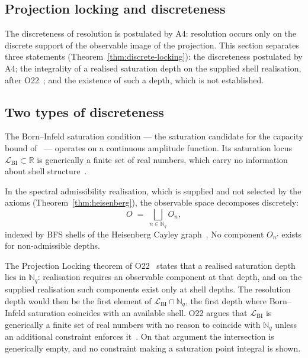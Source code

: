 \documentclass[11pt,a4paper]{article}
\begin{document}
  \subsection{Projection locking and discreteness}
    \label{sec:locking}

    The discreteness of resolution is postulated by A4: resolution occurs only on the discrete support of
    the observable image of the projection.
    This section separates three statements (Theorem~\ref{thm:discrete-locking}): the discreteness
    postulated by A4; the integrality of a realised saturation depth on the supplied shell realisation,
    after O22~\cite{Beau2026a26}; and the existence of such a depth, which is not established.

  \subsection{Two types of discreteness}

    The Born--Infeld saturation condition — the saturation candidate for the
    capacity bound of~\cite{Beau2026c} — operates on a continuous amplitude
    function.
    Its saturation locus $\mathcal{L}_{\mathrm{BI}} \subset \mathbb{R}$ is
    generically a finite set of real numbers, which carry no information about shell
    structure~\cite{Beau2026a26}.

    In the spectral admissibility realisation, which is supplied and not selected by the axioms
    (Theorem~\ref{thm:heisenberg}), the observable space decomposes discretely:
    \begin{equation}
      O \;=\; \bigsqcup_{n \in \mathbb{N}_q} O_n,
    \end{equation}
    indexed by BFS shells of the Heisenberg Cayley graph~\cite{Beau2026a26}.
    No component $O_{n'}$ exists for non-admissible depths.

    The Projection Locking theorem of O22~\cite{Beau2026a26} states that a realised saturation depth lies
    in $\mathbb{N}_q$: realisation requires an observable component at that depth, and on the supplied
    realisation such components exist only at shell depths.
    The resolution depth would then be the first element of
    $\mathcal{L}_{\mathrm{BI}} \cap \mathbb{N}_q$, the first depth where
    Born--Infeld saturation coincides with an available shell.
    O22 argues that $\mathcal{L}_{\mathrm{BI}}$ is generically a finite set of real numbers with no reason to
    coincide with $\mathbb{N}_q$ unless an additional constraint enforces it~\cite{Beau2026a26}.
    On that argument the intersection is generically empty, and no constraint making a saturation point
    integral is shown.
\end{document}
